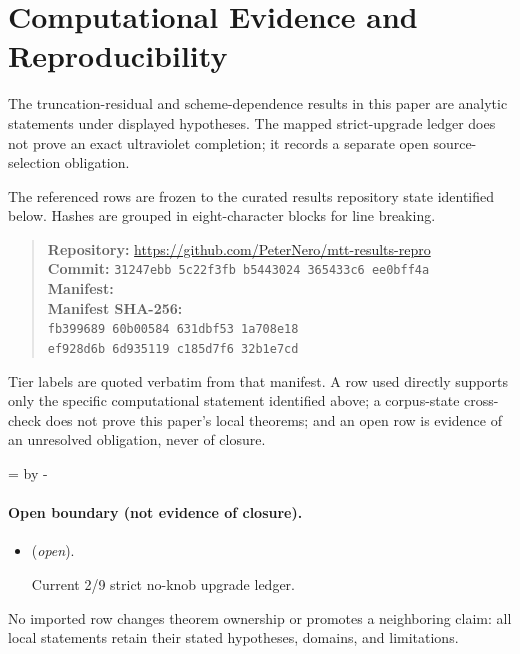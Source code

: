 \documentclass[11pt]{article}
\theoremstyle{definition}
\theoremstyle{remark}
\begin{document}
\section*{Computational Evidence and Reproducibility}
The truncation-residual and scheme-dependence results in this paper are analytic statements under displayed hypotheses. The mapped strict-upgrade ledger does not prove an exact ultraviolet completion; it records a separate open source-selection obligation.

The referenced rows are frozen to the curated results repository state identified below. Hashes are grouped in eight-character blocks for line breaking.
\begin{quote}\small
\textbf{Repository:} \url{https://github.com/PeterNero/mtt-results-repro}\\
\textbf{Commit:} \texttt{31247ebb 5c22f3fb b5443024 365433c6 ee0bff4a}\\
\textbf{Manifest:} \\
\textbf{Manifest SHA-256:}\\
\texttt{fb399689 60b00584 631dbf53 1a708e18}\\
\texttt{ef928d6b 6d935119 c185d7f6 32b1e7cd}
\end{quote}

Tier labels are quoted verbatim from that manifest. A row used directly supports only the specific computational statement identified above; a corpus-state cross-check does not prove this paper's local theorems; and an open row is evidence of an unresolved obligation, never of closure.

\par\begingroup{}=\pagegoal\advance{} by -\pagetotal\ifdim\dimen0<7\baselineskip\newpage\fi\endgroup
\paragraph{Open boundary (not evidence of closure).}
\begin{itemize}
\setlength{\itemsep}{0.25em}
\item {} (\emph{open}).\par Current 2/9 strict no-knob upgrade ledger.
\end{itemize}

No imported row changes theorem ownership or promotes a neighboring claim: all local statements retain their stated hypotheses, domains, and limitations.
\end{document}
